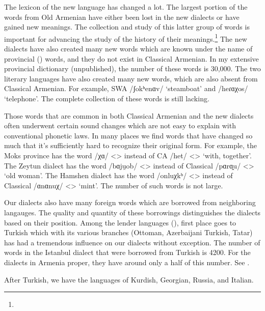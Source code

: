 The lexicon of the new language has changed a lot. The largest portion of the words from Old Armenian have either been lost in the new dialects or have gained new meanings. The collection and study of this latter group of words is important for advancing the study of the history of their meanings.\footnote{} The new dialects have also created many new words which are known under the name of provincial () words, and they do not exist in Classical Armenian. In my extensive provincial dictionary (unpublished), the number of these words is 30,000. The two literary languages have also created many new words, which are also absent from Classical Armenian. For example, SWA /ʃokʰenɑv/  `steamboat' and /heɾɑχos/  `telephone'. The complete collection of these words is still lacking.


\begin{adjarianpage}\label{page:19}\end{adjarianpage}%

Those words that are common in both Classical Armenian and the new dialects often underwent certain sound changes which are not easy to explain with conventional phonetic laws. In many places we find words that have changed so much that it's sufficiently hard to recognize their original form. For example, the Moks province has the word /χɑ/ <> instead of CA /het/ <> `with, together'. The Zeytun dialect has the word /bɑju̯ob/ <> instead of Classical /pɑrɑ̯u/ <> `old woman'. The Hamshen dialect has the word /onluχkʰ/ <> instead of Classical /ɑnɑnuχ/ <> `mint'. The number of such words is not large. 

Our dialects also have many foreign words which are borrowed from neighboring langauges. The quality and quantity of these borrowings distinguishes the dialects based on their position. Among the lender languages (), first place goes to Turkish which with its various branches (Ottoman, Azerbaijani Turkish, Tatar) has had a tremendous influence on our dialects without exception. The number of words in the Istanbul dialect that were borrowed from Turkish is 4200. For the dialects in Armenia proper, they have around only a half of this number. See \citet{Adjarian-1902-TUrkishWordsArmenian}. 

After Turkish, we have the languages of Kurdish, Georgian, Russia, and Italian. 

